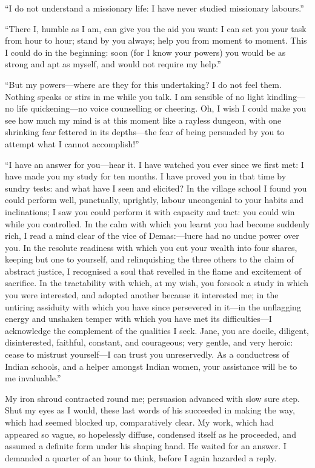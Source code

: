 \enquote{I do not understand a missionary life: I have never studied
	missionary labours.}

\enquote{There I, humble as I am, can give you the aid you want: I can
	set you your task from hour to hour; stand by you always; help you from
	moment to moment. This I could do in the beginning: soon (for I know
	your powers) you would be as strong and apt as myself, and would not
	require my help.}

\enquote{But my powers---where are they for this undertaking? I do not
	feel them. Nothing speaks or stirs in me while you talk. I am sensible
	of no light kindling---no life quickening---no voice counselling or
	cheering. Oh, I wish I could make you see how much my mind is at this
	moment like a rayless dungeon, with one shrinking fear fettered in its
	depths---the fear of being persuaded by you to attempt what I cannot
	accomplish!}

\enquote{I have an answer for you---hear it. I have watched you ever
	since we first met: I have made you my study for ten months. I have
	proved you in that time by sundry tests: and what have I seen and
	elicited? In the village school I found you could perform well,
	punctually, uprightly, labour uncongenial to your habits and
	inclinations; I saw you could perform it with capacity and tact: you
	could win while you controlled. In the calm with which you learnt you
	had become suddenly rich, I read a mind clear of the vice of
	Demas:---lucre had no undue power over you. In the resolute readiness
	with which you cut your wealth into four shares, keeping but one to
	yourself, and relinquishing the three others to the claim of abstract
	justice, I recognised a soul that revelled in the flame and excitement
	of sacrifice. In the tractability with which, at my wish, you forsook a
	study in which you were interested, and adopted another because it
	interested me; in the untiring assiduity with which you have since
	persevered in it---in the unflagging energy and unshaken temper with
	which you have met its difficulties---I acknowledge the complement of
	the qualities I seek. Jane, you are docile, diligent, disinterested,
	faithful, constant, and courageous; very gentle, and very heroic: cease
	to mistrust yourself---I can trust you unreservedly. As a conductress
	of Indian schools, and a helper amongst Indian women, your assistance
	will be to me invaluable.}

My iron shroud contracted round me; persuasion advanced with slow sure
step. Shut my eyes as I would, these last words of his succeeded in
making the way, which had seemed blocked up, comparatively clear. My
work, which had appeared so vague, so hopelessly diffuse, condensed
itself as he proceeded, and assumed a definite form under his shaping
hand. He waited for an answer. I demanded a quarter of an hour to
think, before I again hazarded a reply.

